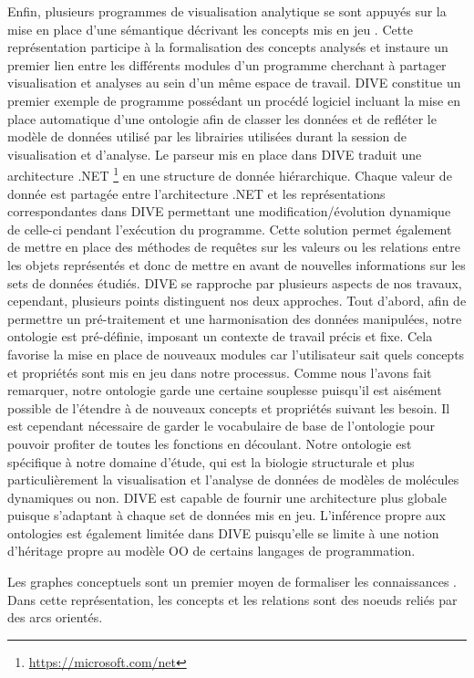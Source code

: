 Enfin, plusieurs programmes de visualisation analytique se sont appuyés sur la mise en place d'une sémantique décrivant les concepts mis en jeu \cite{rysavy_dive:_2014}. Cette représentation participe à la formalisation des concepts analysés et instaure un premier lien entre les différents modules d'un programme cherchant à partager visualisation et analyses au sein d'un même espace de travail. DIVE constitue un premier exemple de programme possédant un procédé logiciel incluant la mise en place automatique d'une ontologie afin de classer les données et de refléter le modèle de données utilisé par les librairies utilisées durant la session de visualisation et d'analyse. Le parseur mis en place dans DIVE traduit une architecture .NET \footnote{\url{https://microsoft.com/net}} en une structure de donnée hiérarchique. Chaque valeur de donnée est partagée entre l'architecture .NET et les représentations correspondantes dans DIVE permettant une modification/évolution dynamique de celle-ci pendant l’exécution du programme. Cette solution permet également de mettre en place des méthodes de requêtes sur les valeurs ou les relations entre les objets représentés et donc de mettre en avant de nouvelles informations sur les sets de données étudiés. DIVE se rapproche par plusieurs aspects de nos travaux, cependant, plusieurs points distinguent nos deux approches. Tout d'abord, afin de permettre un pré-traitement et une harmonisation des données manipulées, notre ontologie est pré-définie, imposant un contexte de travail précis et fixe. Cela favorise la mise en place de nouveaux modules car l'utilisateur sait quels concepts et propriétés sont mis en jeu dans notre processus. Comme nous l'avons fait remarquer, notre ontologie garde une certaine souplesse puisqu'il est aisément possible de l'étendre à de nouveaux concepts et propriétés suivant les besoin. Il est cependant nécessaire de garder le vocabulaire de base de l'ontologie pour pouvoir profiter de toutes les fonctions en découlant. Notre ontologie est spécifique à notre domaine d'étude, qui est la biologie structurale et plus particulièrement la visualisation et l'analyse de données de modèles de molécules dynamiques ou non. DIVE est capable de fournir une architecture plus globale puisque s'adaptant à chaque set de données mis en jeu. L'inférence propre aux ontologies est également limitée dans DIVE puisqu'elle se limite à une notion d'héritage propre au modèle OO de certains langages de programmation.

Les graphes conceptuels sont un premier moyen de formaliser les connaissances \cite{chein2008graph}. Dans cette représentation, les concepts et les relations sont des noeuds reliés par des arcs orientés.

